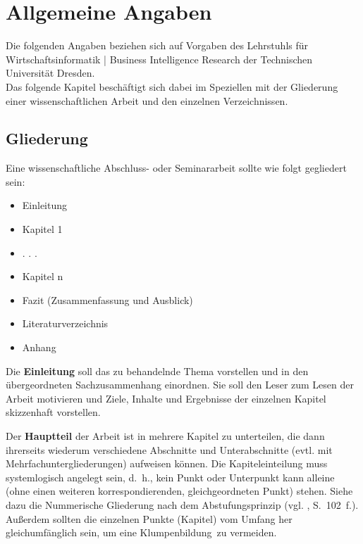 \chapter{Allgemeine Angaben}
\label{chap:allgemeine_Angaben}

Die folgenden Angaben beziehen sich auf Vorgaben des Lehrstuhls für
Wirtschaftsinformatik | Business Intelligence Research der Technischen Universität Dresden.\\
Das folgende Kapitel beschäftigt sich dabei im Speziellen mit der Gliederung einer wissenschaftlichen Arbeit und den einzelnen Verzeichnissen.

\section{Gliederung}
\label{chap:gliederung_Arbeit}

Eine wissenschaftliche Abschluss- oder Seminararbeit sollte wie folgt gegliedert sein:

\begin{itemize}
\item Einleitung
\item Kapitel 1
\item . . .
\item Kapitel n
\item Fazit (Zusammenfassung und Ausblick)
\item Literaturverzeichnis
\item Anhang
\end{itemize}

Die \textbf{Einleitung} soll das zu behandelnde Thema vorstellen und in den übergeordneten
Sachzusammenhang einordnen. Sie soll den Leser zum Lesen der Arbeit motivieren und Ziele, Inhalte und Ergebnisse der
einzelnen Kapitel skizzenhaft vorstellen. 

Der \textbf{Hauptteil} der Arbeit ist in mehrere Kapitel zu
unterteilen, die dann ihrerseits wiederum verschiedene Abschnitte und Unterabschnitte (evtl. mit
Mehrfachuntergliederungen) aufweisen können. Die Kapiteleinteilung muss systemlogisch angelegt sein,
d.~h., kein Punkt oder Unterpunkt kann alleine (ohne einen weiteren korrespondierenden,
gleichgeordneten Punkt) stehen. Siehe dazu die Nummerische Gliederung nach dem Abstufungsprinzip (vgl.
\cite{Theisen2006}, S.~102~f.). Außerdem sollten die einzelnen Punkte (Kapitel) vom Umfang her gleichumfänglich sein,
um eine \glqq Klumpenbildung\grqq \ zu vermeiden. 


